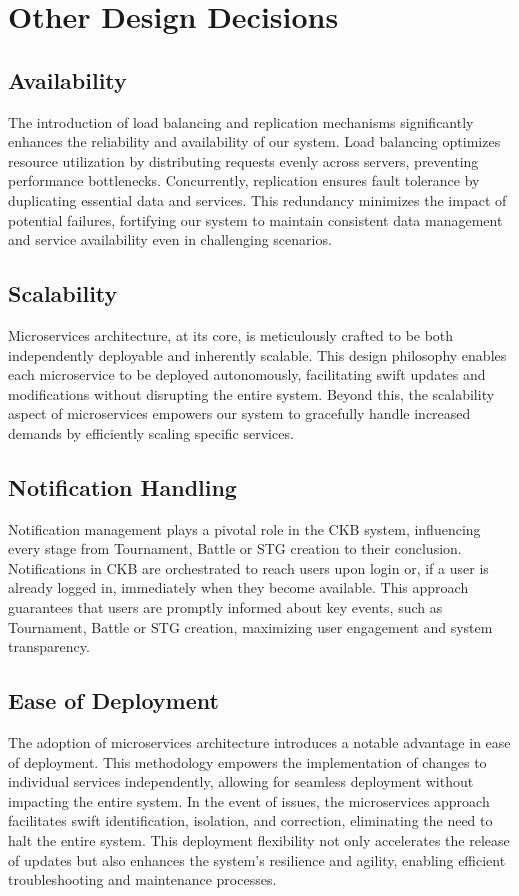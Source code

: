 \section{Other Design Decisions}
\label{sec:other_design_decisions}%

\subsection{Availability}
The introduction of load balancing and replication mechanisms significantly enhances the reliability and availability of our system. Load balancing optimizes resource utilization by distributing requests evenly across servers, preventing performance bottlenecks. Concurrently, replication ensures fault tolerance by duplicating essential data and services. This redundancy minimizes the impact of potential failures, fortifying our system to maintain consistent data management and service availability even in challenging scenarios.

\subsection{Scalability}
Microservices architecture, at its core, is meticulously crafted to be both independently deployable and inherently scalable. This design philosophy enables each microservice to be deployed autonomously, facilitating swift updates and modifications without disrupting the entire system. Beyond this, the scalability aspect of microservices empowers our system to gracefully handle increased demands by efficiently scaling specific services.


\subsection{Notification Handling}
Notification management plays a pivotal role in the CKB system, influencing every stage from Tournament, Battle or STG creation to their conclusion. Notifications in CKB are orchestrated to reach users upon login or, if a user is already logged in, immediately when they become available. This approach guarantees that users are promptly informed about key events, such as Tournament, Battle or STG creation, maximizing user engagement and system transparency. 

\subsection{Ease of Deployment} 
The adoption of microservices architecture introduces a notable advantage in ease of deployment. This methodology empowers the implementation of changes to individual services independently, allowing for seamless deployment without impacting the entire system. In the event of issues, the microservices approach facilitates swift identification, isolation, and correction, eliminating the need to halt the entire system. This deployment flexibility not only accelerates the release of updates but also enhances the system's resilience and agility, enabling efficient troubleshooting and maintenance processes.

